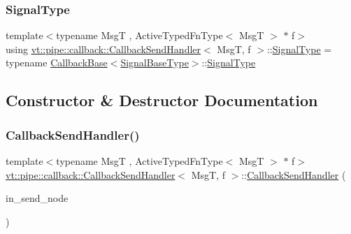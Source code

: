 \mbox{\label{structvt_1_1pipe_1_1callback_1_1_callback_send_handler_a1d3583e27e8cb606b31de9c3a9daa25b}} 
\subsubsection{\texorpdfstring{Signal\+Type}{SignalType}}
{\footnotesize\ttfamily template$<$typename MsgT , Active\+Typed\+Fn\+Type$<$ Msg\+T $>$ $\ast$ f$>$ \\
using \hyperlink{structvt_1_1pipe_1_1callback_1_1_callback_send_handler}{vt\+::pipe\+::callback\+::\+Callback\+Send\+Handler}$<$ MsgT, f $>$\+::\hyperlink{structvt_1_1pipe_1_1callback_1_1_callback_send_handler_a1d3583e27e8cb606b31de9c3a9daa25b}{Signal\+Type} =  typename \hyperlink{structvt_1_1pipe_1_1callback_1_1_callback_base}{Callback\+Base}$<$\hyperlink{structvt_1_1pipe_1_1callback_1_1_callback_send_handler_af46916844a27c29e7c6134f962d0964f}{Signal\+Base\+Type}$>$\+::\hyperlink{structvt_1_1pipe_1_1callback_1_1_callback_send_handler_a1d3583e27e8cb606b31de9c3a9daa25b}{Signal\+Type}}



\subsection{Constructor \& Destructor Documentation}
\mbox{\label{structvt_1_1pipe_1_1callback_1_1_callback_send_handler_af1f6a9e98ca21793a1c6d0505bf65ed9}} 
\subsubsection{\texorpdfstring{Callback\+Send\+Handler()}{CallbackSendHandler()}}
{\footnotesize\ttfamily template$<$typename MsgT , Active\+Typed\+Fn\+Type$<$ Msg\+T $>$ $\ast$ f$>$ \\
\hyperlink{structvt_1_1pipe_1_1callback_1_1_callback_send_handler}{vt\+::pipe\+::callback\+::\+Callback\+Send\+Handler}$<$ MsgT, f $>$\+::\hyperlink{structvt_1_1pipe_1_1callback_1_1_callback_send_handler}{Callback\+Send\+Handler} (\begin{DoxyParamCaption}\item[{\hyperlink{namespacevt_a866da9d0efc19c0a1ce79e9e492f47e2}{Node\+Type} const \&}]{in\+\_\+send\+\_\+node }\end{DoxyParamCaption})}




